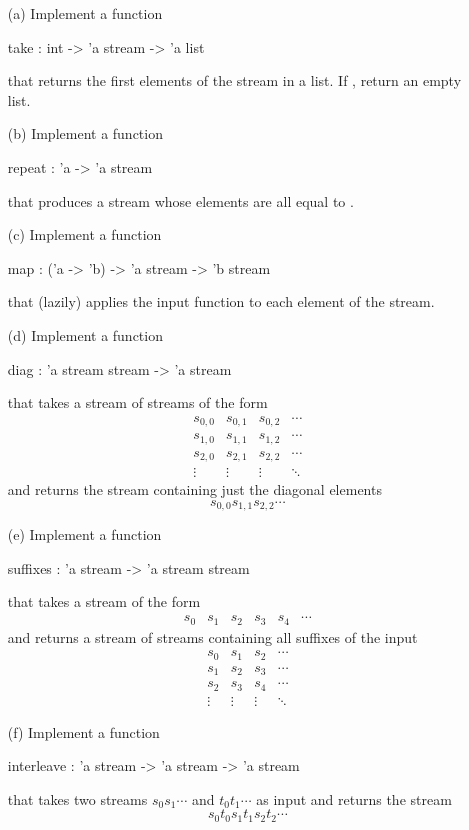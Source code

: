 \documentclass{pset}
\begin{document}
\begin{itemize}
\item[(a)] Implement a function
  \begin{ocaml}
    take : int -> 'a stream -> 'a list
  \end{ocaml}
  that returns the first  elements of the stream 
  in a list. If , return an empty list.
\item[(b)] Implement a function
  \begin{ocaml}
    repeat : 'a -> 'a stream
  \end{ocaml}
  that produces a stream whose elements are all equal to .
\item[(c)] Implement a function
  \begin{ocaml}
    map : ('a -> 'b) -> 'a stream -> 'b stream
  \end{ocaml}
  that (lazily) applies the input function to each element of the
  stream.
\item[(d)] Implement a function
  \begin{ocaml}
    diag : 'a stream stream -> 'a stream
  \end{ocaml}
  that takes a stream of streams of the form
  \[
  \begin{matrix}
    s_{0,0} &  s_{0,1} & s_{0,2} & \cdots \\
    s_{1,0} &  s_{1,1} & s_{1,2} & \cdots \\
    s_{2,0} &  s_{2,1} & s_{2,2} & \cdots \\
    \vdots &  \vdots & \vdots & \ddots
  \end{matrix}
  \]
  and returns the stream containing just the diagonal elements
  \[
  s_{0,0}s_{1,1}s_{2,2}\cdots
  \]
\item[(e)] Implement a function
  \begin{ocaml}
    suffixes : 'a stream -> 'a stream stream
  \end{ocaml}
  that takes a stream of the form 
  \[
  \begin{matrix}
    s_{0} &  s_{1} & s_{2} & s_{3} & s_{4} & \cdots 
  \end{matrix}
  \]
  and returns a stream of streams containing all suffixes of the input
  \[
  \begin{matrix}
    s_{0} &  s_{1} & s_{2} & \cdots \\
    s_{1} &  s_{2} & s_{3} & \cdots \\
    s_{2} &  s_{3} & s_{4} & \cdots \\
    \vdots &  \vdots & \vdots & \ddots
  \end{matrix}
  \]
\item[(f)] Implement a function
  \begin{ocaml}
    interleave : 'a stream -> 'a stream -> 'a stream
  \end{ocaml}
  that takes two streams $s_0s_1\cdots$ and $t_0t_1\cdots$ as input and
  returns the stream
  \[
  s_0t_0s_1t_1s_2t_2\cdots
  \]
\end{itemize}
\end{document}
